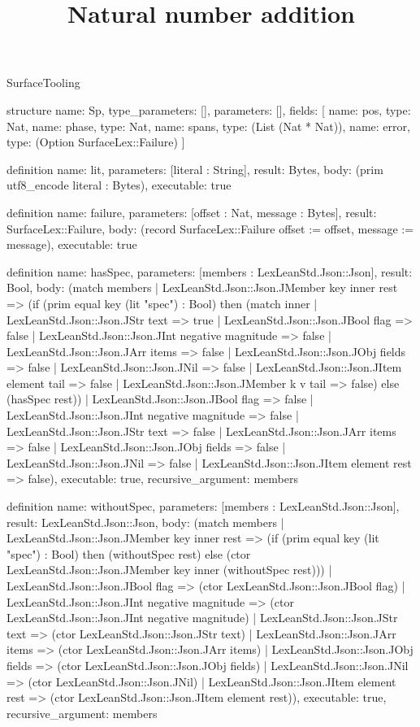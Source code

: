 \begin{lexlean}{SurfaceTooling}
\title{Natural number addition}
\begin{semanticmodule}
structure{
  name: Sp,
  type_parameters: [],
  parameters: [],
  fields: [
    {name: pos, type: Nat},
    {name: phase, type: Nat},
    {name: spans, type: (List (Nat * Nat))},
    {name: error, type: (Option SurfaceLex::Failure)}
  ]
}

definition{
  name: lit,
  parameters: [literal : String],
  result: Bytes,
  body: (prim utf8_encode literal : Bytes),
  executable: true
}

definition{
  name: failure,
  parameters: [offset : Nat, message : Bytes],
  result: SurfaceLex::Failure,
  body: (record SurfaceLex::Failure {offset := offset, message := message}),
  executable: true
}

definition{
  name: hasSpec,
  parameters: [members : LexLeanStd.Json::Json],
  result: Bool,
  body: (match members
    | LexLeanStd.Json::Json.JMember key inner rest => (if (prim equal key (lit "spec") : Bool) then (match inner
      | LexLeanStd.Json::Json.JStr text => true
      | LexLeanStd.Json::Json.JBool flag => false
      | LexLeanStd.Json::Json.JInt negative magnitude => false
      | LexLeanStd.Json::Json.JArr items => false
      | LexLeanStd.Json::Json.JObj fields => false
      | LexLeanStd.Json::Json.JNil => false
      | LexLeanStd.Json::Json.JItem element tail => false
      | LexLeanStd.Json::Json.JMember k v tail => false) else (hasSpec rest))
    | LexLeanStd.Json::Json.JBool flag => false
    | LexLeanStd.Json::Json.JInt negative magnitude => false
    | LexLeanStd.Json::Json.JStr text => false
    | LexLeanStd.Json::Json.JArr items => false
    | LexLeanStd.Json::Json.JObj fields => false
    | LexLeanStd.Json::Json.JNil => false
    | LexLeanStd.Json::Json.JItem element rest => false),
  executable: true,
  recursive_argument: members
}

definition{
  name: withoutSpec,
  parameters: [members : LexLeanStd.Json::Json],
  result: LexLeanStd.Json::Json,
  body: (match members
    | LexLeanStd.Json::Json.JMember key inner rest => (if (prim equal key (lit "spec") : Bool) then (withoutSpec rest) else (ctor LexLeanStd.Json::Json.JMember key inner (withoutSpec rest)))
    | LexLeanStd.Json::Json.JBool flag => (ctor LexLeanStd.Json::Json.JBool flag)
    | LexLeanStd.Json::Json.JInt negative magnitude => (ctor LexLeanStd.Json::Json.JInt negative magnitude)
    | LexLeanStd.Json::Json.JStr text => (ctor LexLeanStd.Json::Json.JStr text)
    | LexLeanStd.Json::Json.JArr items => (ctor LexLeanStd.Json::Json.JArr items)
    | LexLeanStd.Json::Json.JObj fields => (ctor LexLeanStd.Json::Json.JObj fields)
    | LexLeanStd.Json::Json.JNil => (ctor LexLeanStd.Json::Json.JNil)
    | LexLeanStd.Json::Json.JItem element rest => (ctor LexLeanStd.Json::Json.JItem element rest)),
  executable: true,
  recursive_argument: members
}


\end{semanticmodule}
\end{lexlean}
